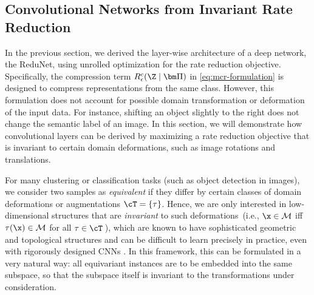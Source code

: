 \documentclass[../../book-main.tex]{subfiles}
\begin{document}
\subsection{Convolutional Networks from Invariant Rate Reduction}\label{sec:shift-invariant}

In the previous section, we derived the layer-wise architecture of a deep network, the ReduNet, using unrolled optimization for the rate reduction objective. 
Specifically, the compression term $R^c_\epsilon(\Z \mid\bm \Pi)$ in \eqref{eq:mcr-formulation} is designed to compress representations from the same class. However, this formulation does not account for possible domain transformation or deformation of the input data. For instance, shifting an object slightly to the right does not change the semantic label of an image.  In this section, we will demonstrate how convolutional layers can be derived by maximizing a rate reduction objective that is invariant to certain domain deformations, such as image rotations and translations. 


For many clustering or classification tasks (such as object detection in images), we consider two samples as {\em equivalent} if they differ by certain classes of domain deformations or augmentations $\cT = \{\tau \}$. Hence, we are only interested in low-dimensional structures that are {\em invariant} to such deformations~(i.e., $\x \in \mathcal{M}$ iff $\tau(\x) \in \mathcal{M}$ for all $\tau \in \cT$\,), 
which are known to have sophisticated geometric and topological structures and can be difficult to learn precisely in practice, even with rigorously designed CNNs \cite{Cohen-ICML-2016}. 
In this framework, this can be formulated in a very natural way: all equivariant instances are to be embedded into the same subspace, so that the subspace itself is invariant to the transformations under consideration.
\end{document}
